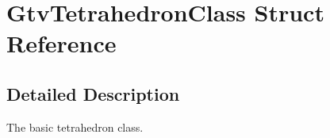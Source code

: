 \section{Gtv\+Tetrahedron\+Class Struct Reference}
\label{structGtvTetrahedronClass}


\subsection{Detailed Description}
The basic tetrahedron class. 